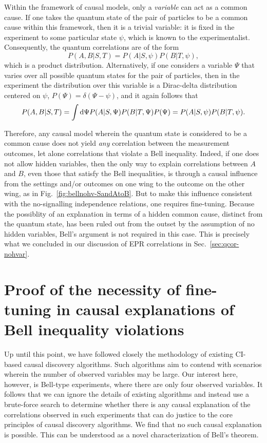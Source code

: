 \documentclass[letterpaper,onecolumn,nofootinbib]{revtex4}
\begin{document}
Within the framework of causal models, only a {\em variable} can act as a common cause. If one takes the quantum state of the pair of particles  to be a common cause within this framework, then it is a trivial variable: it is fixed in the experiment to some particular state $\psi$, which is known to the experimentalist.  Consequently, the quantum correlations are of the form 
\[
P(A,B|S,T)=P(A|S,\psi)P(B|T,\psi),
\]
which is a product distribution.  Alternatively, if one considers a variable $\Psi$ that varies over all possible quantum states for the pair of particles, then in the experiment the distribution over this variable is a Dirac-delta distribution centered on $\psi$, $P(\Psi)=\delta(\Psi-\psi)$, and it again follows that 
\[
P(A,B|S,T)=\int {\rm d}\Psi P(A|S,\Psi)P(B|T,\Psi) P(\Psi)= P(A|S,\psi)P(B|T,\psi).
\]

  Therefore, any causal model wherein the quantum state is considered to be a common cause does not yield {\em any} correlation between the measurement outcomes, let alone correlations that violate a Bell inequality.  
Indeed, if one does not allow hidden variables, then the only way to explain correlations between $A$ and $B$, even those that satisfy the Bell inequalities, is through a causal influence from the settings and/or outcomes on one wing to the outcome on the other wing, as in Fig.~\ref{fig:bellnohv-SandAtoB}.
But to make this influence consistent with the no-signalling independence relations, one requires fine-tuning. 
Because the possiblity of an explanation in terms of a {\rm hidden} common cause, distinct from the quantum state,
 has been ruled out from the outset by the assumption of no hidden variables, Bell's argument is not required in this case.
 This is precisely what we concluded in our discussion of EPR correlations in Sec.~\ref{sec:qcor-nohvar}.  

 
\section{Proof of the necessity of fine-tuning in causal explanations of Bell inequality violations}
\label{sec:theorem}

Up until this point, we have followed closely the methodology of existing CI-based causal discovery algorithms.  
Such algorithms aim to contend with scenarios wherein the number of observed variables may be large.
 Our interest here, however, is Bell-type experiments, where there are only four observed variables.  
 It follows that we can ignore the details of existing algorithms and instead use a brute-force search to determine whether there is any causal explanation of the correlations observed in such experiments that can do justice to the core principles of causal discovery algorithms. 
 We find that no such causal explanation is possible.  This can be understood as a novel characterization of Bell's theorem. 
\end{document}
